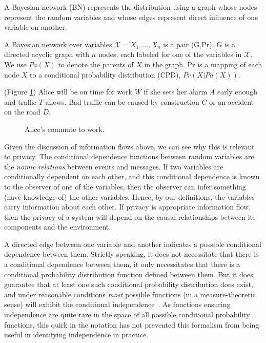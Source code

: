 \documentclass[../thesis.tex]{subfiles}
\begin{document}
A Bayesian network (BN) represents the distribution using a graph
whose nodes represent the random variables and whose edges represent
direct influence of one variable on another.

\begin{dfn}
A Bayesian network over variables $\mathcal{X} = X_1, ..., X_n$ is 
a pair (G,Pr). G is a directed acyclic graph with $n$ nodes, 
each labeled for one of the variables in $\mathcal{X}$. We use
$Pa(X)$ to denote the parents of $X$ in the graph. Pr is a mapping
of each node $X$ to a conditional probability distribution (CPD),
$Pr(X \vert Pa(X))$.
\end{dfn}

\begin{exm}
  (Figure \ref{fig:alice-commute})
  Alice will be on time for work $W$ if she sets her
  alarm $A$ early enough and traffic $T$ allows.
  Bad traffic can be caused by construction $C$
  or an accident on the road $D$.
\end{exm}

\begin{figure}
  \label{fig:alice-commute}
\begin{center}
\end{center}
\caption{Alice's commute to work.}
\end{figure}

Given the discussion of information flows above,
we can see why this
is relevant to privacy. The conditional dependence
functions between
random variables are the \emph{nomic relations}
between events and messages.
If two variables are conditionally dependent on
each other, and this
conditional dependence is known to the observer of one
of the variables,
then the observer can infer something (have knowledge of)
the other
variables. Hence, by our definitions, the variables carry
information about each other.
If privacy is appropriate information flow, then
the privacy of a system will depend on the
causal relationships between its components
and the environment.

A directed edge between one variable and another
indicates a possible
conditional dependence between them.
Strictly speaking, it does not
necessitate that there is a conditional dependence between them,
it only necessitates that there is a conditional
probability distribution
function defined between them.
But it does guarantee that at least one such conditional
probability distribution does exist, and under reasonable
conditions \emph{most} possible functions
(in a measure-theoretic sense) will exhibit
the conditional independence~\cite{meek1995strong}.
As functions ensuring
independence are quite rare in the space of all possible
conditional probability functions, this quirk in the
notation has not prevented
this formalism from being useful in identifying
independence in practice.
\end{document}
